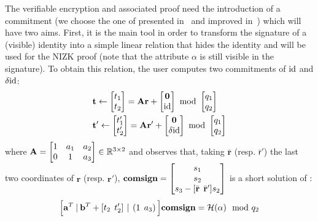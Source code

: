  The verifiable encryption and associated proof need the introduction of 
 a commitment (we choose the one of presented in~\cite{SCN:BDLOP18} and improved in~\cite{C:AttLyuSei20}) which will have two aims.
First, it is the main tool in order to transform the signature of a 
(visible) identity into a simple linear relation that hides the identity 
and will be used for the NIZK proof (note that the attribute $\alpha$ is 
still visible in the signature). To obtain this relation, the user 
computes two commitments of $\text{id}$ and $\delta \text{id}$:
\begin{align*} 
&\mathbf{t} \gets \begin{bmatrix}t_1\\ t_2\end{bmatrix} = \mathbf{A}\mathbf{r} +
\begin{bmatrix}\mathbf{0} \\ \text{id} \end{bmatrix} 
\!\!\mod \begin{bmatrix}q_1 \\ q_2 \end{bmatrix}
\\
&\mathbf{t'} \gets \begin{bmatrix}t'_1\\ t'_2\end{bmatrix} = \mathbf{A}\mathbf{r'} + \begin{bmatrix}\mathbf{0} \\ \delta\text{id} \end{bmatrix}
\!\!\mod \begin{bmatrix}q_1 \\ q_2 \end{bmatrix}
\end{align*}
where $\mathbf{A} = \begin{bmatrix} 1 & a_1 & a_2 \\ 0 & 1 & a_3 \end{bmatrix} \in \mathbb{R}^{3 \times 2}$
and observes that, taking $\bar{\mathbf{r}}$ (resp. $\bar{\mathsf{r}}'$) the last two coordinates of
$\mathbf{r}$ (resp. $\mathbf{r'}$),   $\mathbf{comsign} = \begin{bmatrix} s_{1} \\ s_{2} \\ s_{3} -
	[\bar{\mathbf{r}}\:\: \bar{\mathbf{r}}']s_{2}
\end{bmatrix}$ is a short solution of : \begin{equation}\label{eq:02_TechIntro_comsign}
\Big[\mathbf{a}^T\:|\: \mathbf{b}^T + \left[ t_2 \:\: t'_2\right] \:|\: \left(1 \:\: a_3\right)\Big] \mathbf{comsign} = \mathcal{H}(\alpha) \mod {q_2}
\end{equation}

